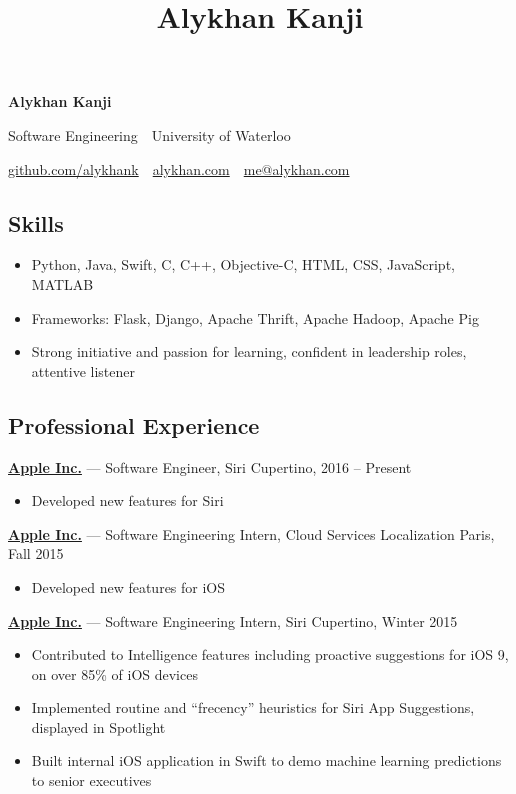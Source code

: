 \documentclass[pdftex,11pt,letterpaper]{article}
\title{Alykhan Kanji}
\begin{document}
\font

\begin{center}
  {\Huge \textbf{Alykhan Kanji}}

  {\large
    Software Engineering\ \textperiodcentered \ University of Waterloo

    \href{https://github.com/alykhank}{github.com/alykhank}\ \textperiodcentered \ \href{https://alykhan.com}{alykhan.com}\ \textperiodcentered \ \href{mailto:me@alykhan.com}{me@alykhan.com}
  }
\end{center}

\subsection*{Skills}

\begin{itemize}[before=,after=]
  \item Python, Java, Swift, C, C++, Objective-C, HTML, CSS, JavaScript, MATLAB
  \item Frameworks: Flask, Django, Apache Thrift, Apache Hadoop, Apache Pig
  \item Strong initiative and passion for learning, confident in leadership roles, attentive listener
\end{itemize}

\subsection*{Professional Experience}

\href{https://apple.com}{\textbf{Apple Inc.}} --- Software Engineer, Siri \hfill {\color{gray} Cupertino, 2016 -- Present}
\begin{itemize}
  \item Developed new features for Siri
\end{itemize}

\href{https://apple.com}{\textbf{Apple Inc.}} --- Software Engineering Intern, Cloud Services Localization \hfill {\color{gray} Paris, Fall 2015}
\begin{itemize}
  \item Developed new features for iOS
\end{itemize}

\href{https://apple.com}{\textbf{Apple Inc.}} --- Software Engineering Intern, Siri \hfill {\color{gray} Cupertino, Winter 2015}
\begin{itemize}
  \item Contributed to Intelligence features including proactive suggestions for iOS 9, on over 85\% of iOS devices
  \item Implemented routine and ``frecency'' heuristics for Siri App Suggestions, displayed in Spotlight
  \item Built internal iOS application in Swift to demo machine learning predictions to senior executives
\end{itemize}
\end{document}
